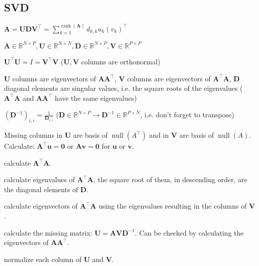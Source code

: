\documentclass[a4paper, 11pt, landscape]{article}
\begin{document}
\begin{multicols*}{3}
\section{SVD}
\begin{compactitem}
	\item $\mathbf{A} = \mathbf{U} \mathbf{D} \mathbf{V}^\top = \sum_{k=1}^{\operatorname{rank}(\mathbf{A})} d_{k,k} u_k (v_k)^\top$
	\item $\mathbf{A} \in \mathbb{R}^{N \times P}, \mathbf{U} \in \mathbb{R}^{N \times N}, \mathbf{D} \in \mathbb{R}^{N \times P}, \mathbf{V} \in \mathbb{R}^{P \times P}$
	\item $\mathbf{U}^\top \mathbf{U} = I = \mathbf{V}^\top \mathbf{V}$ ($\mathbf{U}, \mathbf{V}$ columns are orthonormal)
	\item $\mathbf{U}$ columns are eigenvectors of $\mathbf{A} \mathbf{A}^\top$, $\mathbf{V}$ columns are eigenvectors of $\mathbf{A}^\top \mathbf{A}$, $\mathbf{D}$ diagonal elements are singular values, i.e. the square roots of the eigenvalues ($\mathbf{A}^\top \mathbf{A}$ and $\mathbf{A} \mathbf{A}^\top$ have the same eigenvalues)
	\item $(\mathbf{D}^{-1})_{i,i} = \frac{1}{\mathbf{D}_{i, i}}$ ($\mathbf{D} \in \mathbb{R}^{N \times P} \to \mathbf{D}^{-1} \in \mathbb{R}^{P \times N}$, i.e. don't forget to transpose)
	\item Missing columns in $\mathbf{U}$ are basis of $\operatorname{null}(A^\top)$ and in $\mathbf{V}$ are basis of $\operatorname{null}(A)$. Calculate: $\mathbf{A}^\top \mathbf{u} = \mathbf{0}$ or $\mathbf{A} \mathbf{v} = \mathbf{0}$ for $\mathbf{u}$ or $\mathbf{v}$.
\end{compactitem}

\begin{compactenum}
	\item calculate $\mathbf{A}^\top \mathbf{A}$.
	\item calculate eigenvalues of $\mathbf{A}^\top \mathbf{A}$, the square root of them, in descending order, are the diagonal elements of $\mathbf{D}$.
	\item calculate eigenvectors of $\mathbf{A}^\top \mathbf{A}$ using the eigenvalues resulting in the columns of $\mathbf{V}$.
	\item calculate the missing matrix: $\mathbf{U} = \mathbf{A} \mathbf{V} \mathbf{D}^{-1}$. Can be checked by calculating the eigenvectors of $\mathbf{A} \mathbf{A}^\top$.
	\item normalize each column of $\mathbf{U}$ and $\mathbf{V}$.
\end{compactenum}


\end{multicols*}
\end{document}
